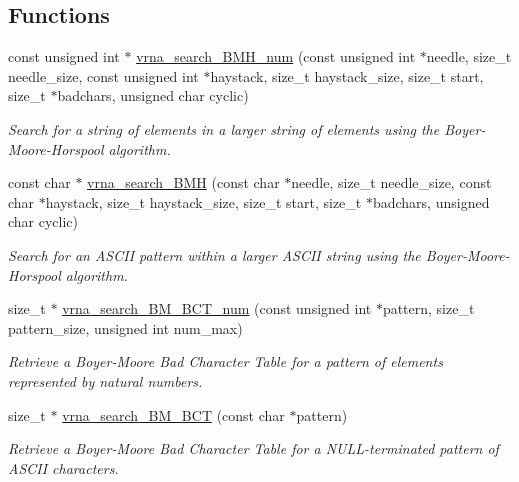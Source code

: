 \subsection*{Functions}
\begin{DoxyCompactItemize}
\item 
const unsigned int $\ast$ \hyperlink{group__search__utils_ga8af89ab58905851f3dbd52624227d372}{vrna\+\_\+search\+\_\+\+B\+M\+H\+\_\+num} (const unsigned int $\ast$needle, size\+\_\+t needle\+\_\+size, const unsigned int $\ast$haystack, size\+\_\+t haystack\+\_\+size, size\+\_\+t start, size\+\_\+t $\ast$badchars, unsigned char cyclic)
\begin{DoxyCompactList}\small\item\em Search for a string of elements in a larger string of elements using the Boyer-\/\+Moore-\/\+Horspool algorithm. \end{DoxyCompactList}\item 
const char $\ast$ \hyperlink{group__search__utils_ga72574a7cf9786d825ce73f7f7748d3c4}{vrna\+\_\+search\+\_\+\+B\+MH} (const char $\ast$needle, size\+\_\+t needle\+\_\+size, const char $\ast$haystack, size\+\_\+t haystack\+\_\+size, size\+\_\+t start, size\+\_\+t $\ast$badchars, unsigned char cyclic)
\begin{DoxyCompactList}\small\item\em Search for an A\+S\+C\+II pattern within a larger A\+S\+C\+II string using the Boyer-\/\+Moore-\/\+Horspool algorithm. \end{DoxyCompactList}\item 
size\+\_\+t $\ast$ \hyperlink{group__search__utils_gad315a442e099c86c5dbf6c1c7933223d}{vrna\+\_\+search\+\_\+\+B\+M\+\_\+\+B\+C\+T\+\_\+num} (const unsigned int $\ast$pattern, size\+\_\+t pattern\+\_\+size, unsigned int num\+\_\+max)
\begin{DoxyCompactList}\small\item\em Retrieve a Boyer-\/\+Moore Bad Character Table for a pattern of elements represented by natural numbers. \end{DoxyCompactList}\item 
size\+\_\+t $\ast$ \hyperlink{group__search__utils_ga1d675ef5dcdcc8c33a1b79956a246697}{vrna\+\_\+search\+\_\+\+B\+M\+\_\+\+B\+CT} (const char $\ast$pattern)
\begin{DoxyCompactList}\small\item\em Retrieve a Boyer-\/\+Moore Bad Character Table for a N\+U\+L\+L-\/terminated pattern of A\+S\+C\+II characters. \end{DoxyCompactList}\end{DoxyCompactItemize}


